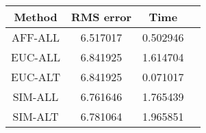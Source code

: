 \begin{tabular}{cccc}
Method&RMS error& Time\\\hline
AFF-ALL&6.517017&0.502946 \\\hline
EUC-ALL&6.841925&1.614704 \\\hline
EUC-ALT&6.841925&0.071017 \\\hline
SIM-ALL&6.761646&1.765439 \\\hline
SIM-ALT&6.781064&1.965851 \\\hline
\end{tabular}

